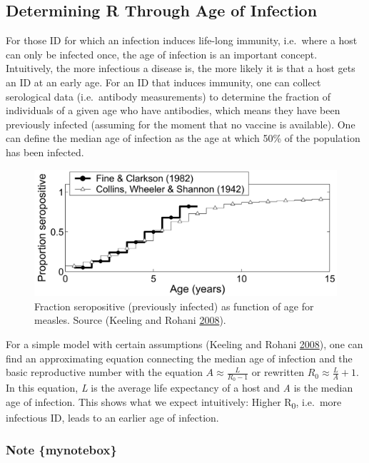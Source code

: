 \documentclass[]{book}
\theoremstyle{definition}
\theoremstyle{definition}
\theoremstyle{definition}
\theoremstyle{remark}
\begin{document}
\subsection{Determining R Through Age of
Infection}\label{determining-r-through-age-of-infection}

For those ID for which an infection induces life-long immunity,
i.e.~where a host can only be infected once, the age of infection is an
important concept. Intuitively, the more infectious a disease is, the
more likely it is that a host gets an ID at an early age. For an ID that
induces immunity, one can collect serological data (i.e.~antibody
measurements) to determine the fraction of individuals of a given age
who have antibodies, which means they have been previously infected
(assuming for the moment that no vaccine is available). One can define
the median age of infection as the age at which 50\% of the population
has been infected.

\begin{figure}
\centering
\includegraphics{./images/R0age.png}
\caption{\label{fig:R0age}Fraction seropositive (previously infected) as
function of age for measles. Source (Keeling and Rohani
\protect\hyperlink{ref-keeling08}{2008}).}
\end{figure}

For a simple model with certain assumptions (Keeling and Rohani
\protect\hyperlink{ref-keeling08}{2008}), one can find an approximating
equation connecting the median age of infection and the basic
reproductive number with the equation \(A \approx \frac {L}{R_0 - 1}\)
or rewritten \(R_0 \approx \frac{L}{A} + 1\). In this equation, \emph{L}
is the average life expectancy of a host and \emph{A} is the median age
of infection. This shows what we expect intuitively: Higher
R\textsubscript{0}, i.e.~more infectious ID, leads to an earlier age of
infection.

\subsubsection{Note \{mynotebox\}}\label{note-mynotebox}
\end{document}

